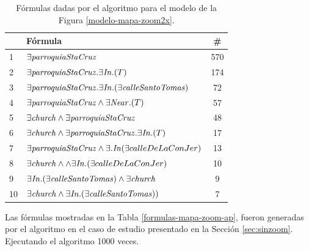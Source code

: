 \begin{table}[h]
\begin{center}
\begin{tabular}{|l|l|c|}
\hline
&F\'ormula                           &  \# \\ \hline \hline
1& $\exists \mathit{parroquiaStaCruz}$& 570\\ \hline

2& $\exists \mathit{parroquiaStaCruz}. \exists \mathit{In}.(T)$& 174\\ \hline
3& $\exists \mathit{parroquiaStaCruz}. \exists \mathit{In}.(\exists \mathit{calleSantoTomas})$& 72\\ \hline
4& $\exists \mathit{parroquiaStaCruz} \land \exists\mathit{Near}.(T)$& 57\\ \hline

5& $\exists \mathit{church} \land \exists \mathit{parroquiaStaCruz}$& 48\\ \hline
6& $\exists \mathit{church} \land \exists \mathit{parroquiaStaCruz}. \exists \mathit{In}.(T)$& 17\\ \hline
7& $\exists \mathit{parroquiaStaCruz} \land \exists. \mathit{In}(\exists calleDeLaConJer)$& 13\\ \hline
8& $\exists \mathit{church} \land \land \exists \mathit{In}.(\exists calleDeLaConJer) $&10\\ \hline

9& $\exists \mathit{In}.(\exists \mathit{calleSantoTomas}) \land \exists \mathit{church}$&9\\ \hline

10& $\exists \mathit{church} \land \exists \mathit{In}.(\exists \mathit{calleSantoTomas}))$&7\\ \hline


\end{tabular}

\caption{F\'ormulas dadas por el algoritmo para el modelo de la Figura \protect\ref{modelo-mapa-zoom2x}.}\label{formulas-mapa-zoom2x-apendice}
\end{center}
\end{table}


Las f\'ormulas mostradas en la Tabla \ref{formulas-mapa-zoom-ap}, fueron generadas por el algoritmo en el caso de estudio presentado en la Secci\'on \ref{sec:sinzoom}. Ejecutando el algoritmo 1000 veces.

